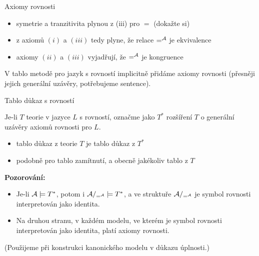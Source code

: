 \documentclass{beamer}
\begin{document}
\begin{frame}{Axiomy rovnosti}


    \pause
    \begin{itemize}
        \item symetrie a tranzitivita plynou z (iii) pro $=$ (dokažte si)\pause
        \item z axiomů $(i)$ a $(iii)$ tedy plyne, že relace $=^{\mathcal{A}}$ je ekvivalence\pause
        \item axiomy $(ii)$ a $(iii)$ vyjadřují, že $=^{\mathcal{A}}$ je kongruence\pause
    \end{itemize}

    V tablo metodě pro jazyk s rovností implicitně přidáme axiomy rovnosti (přesněji jejich generální uzávěry, potřebujeme sentence).

\end{frame}


\begin{frame}{Tablo důkaz s rovností}

    \pause
    Je-li $T$ teorie v jazyce $L$ s rovností, označme jako $T^*$ rozšíření $T$ o generální uzávěry axiomů rovnosti pro $L$. 

    \pause
    \begin{itemize}
        \item \alert{tablo důkaz} z teorie $T$ je \alert{tablo důkaz} z $T^*$\pause
        \item podobně pro tablo zamítnutí, a obecně jakékoliv tablo z $T$
    \end{itemize}
 
    \pause
    \textbf{Pozorování:}\pause
    \begin{itemize}
        \item Je-li $\mathcal{A}\models T^*$, potom i $\mathcal{A}/_{=^{\mathcal{A}}}\models T^*$, a ve struktuře $\mathcal{A}/_{=^{\mathcal{A}}}$ je symbol rovnosti interpretován jako identita.\pause
        \item Na druhou stranu, v každém modelu, ve kterém je symbol rovnosti interpretován jako identita, platí axiomy rovnosti.
    \end{itemize}
     
    \pause
    (Použijeme při konstrukci \alert{kanonického modelu} v důkazu úplnosti.)

\end{frame}
\end{document}
